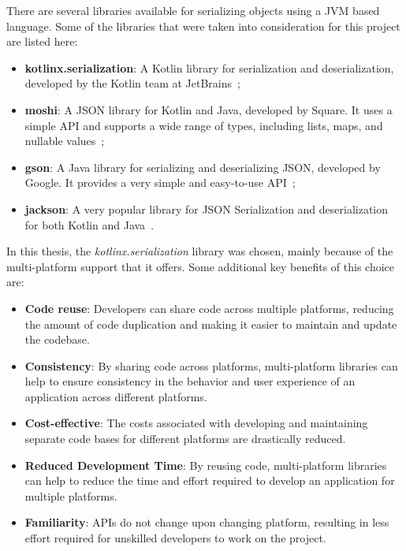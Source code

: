 There are several libraries available for serializing objects using a JVM based language. Some of the libraries that were taken into consideration for this project are listed here:
\begin{itemize}
	\item \textbf{kotlinx.serialization}: A Kotlin library for serialization and deserialization, developed by the Kotlin team at JetBrains~\cite{Kotlinko43:online};
	\item \textbf{moshi}: A JSON library for Kotlin and Java, developed by Square. It uses a simple API and supports a wide range of types, including lists, maps, and nullable values~\cite{squaremo84:online};
	\item \textbf{gson}: A Java library for serializing and deserializing JSON, developed by Google. It provides a very simple and easy-to-use API~\cite{googlegs30:online};
	\item \textbf{jackson}: A very popular library for JSON Serialization and deserialization for both Kotlin and Java~\cite{FasterXM63:online}.
\end{itemize}

In this thesis, the \textit{kotlinx.serialization} library was chosen, mainly because of the multi-platform support that it offers. Some additional key benefits of this choice are:

\begin{itemize}
	\item \textbf{Code reuse}: Developers can share code across multiple platforms, reducing the amount of code duplication and making it easier to maintain and update the codebase.
	\item \textbf{Consistency}: By sharing code across platforms, multi-platform libraries can help to ensure consistency in the behavior and user experience of an application across different platforms.
	\item \textbf{Cost-effective}: The costs associated with developing and maintaining separate code bases for different platforms are drastically reduced.
	\item \textbf{Reduced Development Time}: By reusing code, multi-platform libraries can help to reduce the time and effort required to develop an application for multiple platforms.
	\item \textbf{Familiarity}: APIs do not change upon changing platform, resulting in less effort required for unskilled developers to work on the project.
\end{itemize}


